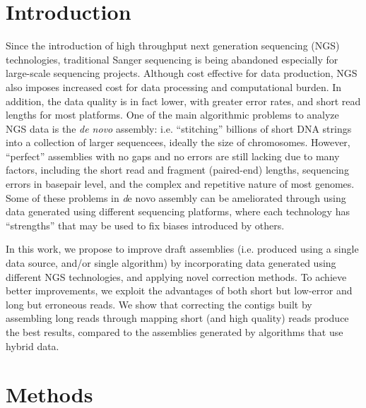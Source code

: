 \documentclass[12pt]{article}
\begin{document}
\onehalfspacing
\vspace*{-0.3cm}
\section{Introduction}
Since the introduction of high throughput next generation sequencing (NGS) technologies, traditional Sanger sequencing is being abandoned especially for large-scale sequencing projects.
Although cost effective for data production, NGS also imposes increased cost for data processing and computational burden. In addition, the data quality is in fact lower, with greater error rates, and short
read lengths for most platforms. One of the main algorithmic problems to analyze NGS data is the \textit{de novo} assembly: i.e. ``stitching'' billions of short DNA strings into a collection of larger sequencees, ideally the size of chromosomes. However, ``perfect'' assemblies with no gaps and no errors are still lacking due to many factors,  including the short read and fragment (paired-end) lengths, sequencing errors in basepair level, and the complex and repetitive nature of most genomes. Some of these problems in {\textit de novo} assembly can be ameliorated through using data generated using different sequencing platforms, where each technology has ``strengths'' that may be used to fix biases introduced by others.


In this work, we propose to  improve draft assemblies (i.e. produced using a single data source, and/or single algorithm) by incorporating data generated using different NGS technologies, and applying novel correction methods. To achieve better improvements, we exploit the advantages of both short but low-error 
and long but erroneous reads. 
We show that correcting the contigs built by assembling long reads through mapping short (and high quality) reads produce the best results, compared to the assemblies generated by algorithms that use hybrid data.
\vspace*{-0.3cm}
\section{Methods}
\label{meth}
\end{document}
